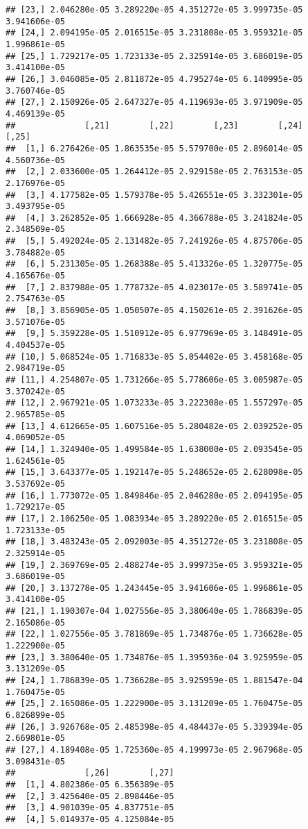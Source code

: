 \documentclass[
]{article}
\begin{document}
\begin{verbatim}
## [23,] 2.046280e-05 3.289220e-05 4.351272e-05 3.999735e-05 3.941606e-05
## [24,] 2.094195e-05 2.016515e-05 3.231808e-05 3.959321e-05 1.996861e-05
## [25,] 1.729217e-05 1.723133e-05 2.325914e-05 3.686019e-05 3.414100e-05
## [26,] 3.046085e-05 2.811872e-05 4.795274e-05 6.140995e-05 3.760746e-05
## [27,] 2.150926e-05 2.647327e-05 4.119693e-05 3.971909e-05 4.469139e-05
##              [,21]        [,22]        [,23]        [,24]        [,25]
##  [1,] 6.276426e-05 1.863535e-05 5.579700e-05 2.896014e-05 4.560736e-05
##  [2,] 2.033600e-05 1.264412e-05 2.929158e-05 2.763153e-05 2.176976e-05
##  [3,] 4.177582e-05 1.579378e-05 5.426551e-05 3.332301e-05 3.493795e-05
##  [4,] 3.262852e-05 1.666928e-05 4.366788e-05 3.241824e-05 2.348509e-05
##  [5,] 5.492024e-05 2.131482e-05 7.241926e-05 4.875706e-05 3.784882e-05
##  [6,] 5.231305e-05 1.268388e-05 5.413326e-05 1.320775e-05 4.165676e-05
##  [7,] 2.837988e-05 1.778732e-05 4.023017e-05 3.589741e-05 2.754763e-05
##  [8,] 3.856905e-05 1.050507e-05 4.150261e-05 2.391626e-05 3.571076e-05
##  [9,] 5.359228e-05 1.510912e-05 6.977969e-05 3.148491e-05 4.404537e-05
## [10,] 5.068524e-05 1.716833e-05 5.054402e-05 3.458168e-05 2.984719e-05
## [11,] 4.254807e-05 1.731266e-05 5.778606e-05 3.005987e-05 3.370242e-05
## [12,] 2.967921e-05 1.073233e-05 3.222308e-05 1.557297e-05 2.965785e-05
## [13,] 4.612665e-05 1.607516e-05 5.280482e-05 2.039252e-05 4.069052e-05
## [14,] 1.324940e-05 1.499584e-05 1.638000e-05 2.093545e-05 1.624561e-05
## [15,] 3.643377e-05 1.192147e-05 5.248652e-05 2.628098e-05 3.537692e-05
## [16,] 1.773072e-05 1.849846e-05 2.046280e-05 2.094195e-05 1.729217e-05
## [17,] 2.106250e-05 1.083934e-05 3.289220e-05 2.016515e-05 1.723133e-05
## [18,] 3.483243e-05 2.092003e-05 4.351272e-05 3.231808e-05 2.325914e-05
## [19,] 2.369769e-05 2.488274e-05 3.999735e-05 3.959321e-05 3.686019e-05
## [20,] 3.137278e-05 1.243445e-05 3.941606e-05 1.996861e-05 3.414100e-05
## [21,] 1.190307e-04 1.027556e-05 3.380640e-05 1.786839e-05 2.165086e-05
## [22,] 1.027556e-05 3.781869e-05 1.734876e-05 1.736628e-05 1.222900e-05
## [23,] 3.380640e-05 1.734876e-05 1.395936e-04 3.925959e-05 3.131209e-05
## [24,] 1.786839e-05 1.736628e-05 3.925959e-05 1.881547e-04 1.760475e-05
## [25,] 2.165086e-05 1.222900e-05 3.131209e-05 1.760475e-05 6.826899e-05
## [26,] 3.926768e-05 2.485398e-05 4.484437e-05 5.339394e-05 2.669801e-05
## [27,] 4.189408e-05 1.725360e-05 4.199973e-05 2.967968e-05 3.098431e-05
##              [,26]        [,27]
##  [1,] 4.802386e-05 6.356389e-05
##  [2,] 3.425640e-05 2.898446e-05
##  [3,] 4.901039e-05 4.837751e-05
##  [4,] 5.014937e-05 4.125084e-05

\end{verbatim}
\end{document}
